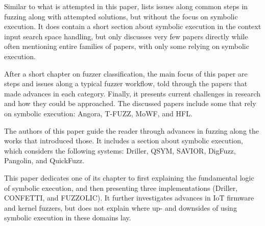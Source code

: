 \documentclass{article}
\begin{document}
\begin{multicols}{2}
    Similar to what is attempted in this paper,  lists issues along common steps in fuzzing along with attempted solutions, but without the focus on symbolic execution. It does contain a short section about symbolic execution in the context input search space handling, but only discusses very few papers directly while often mentioning entire families of papers, with only some relying on symbolic execution.

    After a short chapter on fuzzer classification, the main focus of this paper are steps and issues along a typical fuzzer workflow, told through the papers that made advances in each category. Finally, it presents current challenges in research and how they could be approached. The discussed papers include some that rely on symbolic execution: Angora\cite{Angora}, T-FUZZ\cite{TFuzz}, MoWF\cite{MoWF}, and HFL\cite{HFL}.

    The authors of this paper guide the reader through advances in fuzzing along the works that introduced those. It includes a section about symbolic execution, which considers the following systems: Driller\cite{Driller}, QSYM\cite{QSYM}, SAVIOR\cite{SAVIOR}, DigFuzz\cite{DigFuzz}, Pangolin\cite{Pangolin}, and QuickFuzz\cite{QuickFuzz}.

    This paper dedicates one of its chapter to first explaining the fundamental logic of symbolic execution, and then presenting three implementations (Driller\cite{Driller}, CONFETTI\cite{CONFETTI}, and FUZZOLIC\cite{FUZZOLIC}). It further investigates advances in IoT firmware and kernel fuzzers, but does not explain where up- and downsides of using symbolic execution in these domains lay.


\end{multicols}
\end{document}
